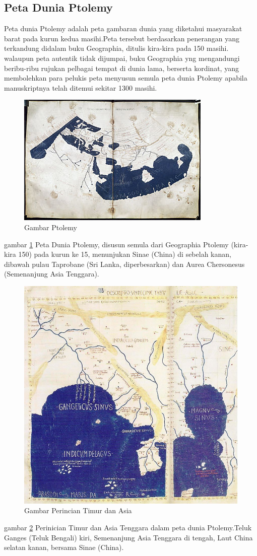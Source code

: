 \subsection{Peta Dunia Ptolemy}
		Peta dunia Ptolemy adalah peta gambaran dunia yang diketahui masyarakat barat pada kurun kedua masihi.Peta tersebut berdasarkan penerangan yang terkandung didalam buku Geographia, ditulis kira-kira pada 150 masihi. walaupun peta autentik tidak dijumpai, buku Geographia yng mengandungi beribu-ribu rujukan pelbagai tempat di dunia lama, berserta kordinat, yang membolehkan para pelukis peta menyusun semula peta dunia Ptolemy apabila manuskriptnya telah ditemui sekitar 1300 masihi.
	\begin{figure} [ht]
	\centerline{\includegraphics[width=.5\textwidth]{figures/PtolemyWorldMap}}
	\caption{Gambar Ptolemy}	
	\label{PtolemyWorldMap}
	\end{figure}
	gambar \ref {PtolemyWorldMap} Peta Dunia Ptolemy, disusun semula dari Geographia Ptolemy (kira-kira 150) pada kurun ke 15, menunjukan Sinae (China) di sebelah kanan, dibawah pulau Taprobane (Sri Lanka, diperbesarkan) dan Aurea Chersonesus (Semenanjung Asia Tenggara).

	\begin{figure} [ht]
	\centerline{\includegraphics[width=.5\textwidth]{figures/PtolemyAsiadetail}}	
	\caption{Gambar Perincian Timur dan Asia}
	\label{PtolemyAsiadetail}		
	\end{figure}
	gambar \ref{PtolemyAsiadetail} Perinician Timur dan Asia Tenggara dalam peta dunia Ptolemy.Teluk Ganges (Teluk Bengali) kiri, Semenanjung Asia Tenggara di tengah, Laut China selatan kanan, bersama Sinae (China).
	
